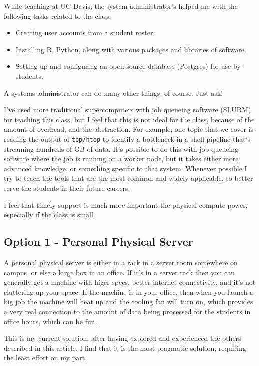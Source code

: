 \documentclass[12pt]{article}
\begin{document}
While teaching at UC Davis, the system administrator's helped me with the following tasks related to the class:
\begin{itemize}
\item Creating user accounts from a student roster.
\item Installing R, Python, along with various packages and libraries of software.
\item Setting up and configuring an open source database (Postgres) for use by students.
\end{itemize}

A systems administrator can do many other things, of course.
Just ask!

I've used more traditional supercomputers with job queueing software (SLURM) for teaching this class, but I feel that this is not ideal for the class, because of the amount of overhead, and the abstraction.
For example, one topic that we cover is reading the output of \texttt{top/htop} to identify a bottleneck in a shell pipeline that's streaming hundreds of GB of data.
It's possible to do this with job queueing software where the job is running on a worker node, but it takes either more advanced knowledge, or something specific to that system.
Whenever possible I try to teach the tools that are the most common and widely applicable, to better serve the students in their future careers.

I feel that timely support is much more important the physical compute power, especially if the class is small.

\subsection{Option 1 - Personal Physical Server}

A personal physical server is either in a rack in a server room somewhere on campus, or else a large box in an office.
If it's in a server rack then you can generally get a machine with higer specs, better internet connectivity, and it's not cluttering up your space.
If the machine is in your office, then when you launch a big job the machine will heat up and the cooling fan will turn on, which provides a very real connection to the amount of data being processed for the students in office hours, which can be fun.

This is my current solution, after having explored and experienced the others described in this article.
I find that it is the most pragmatic solution, requiring the least effort on my part.
\end{document}
